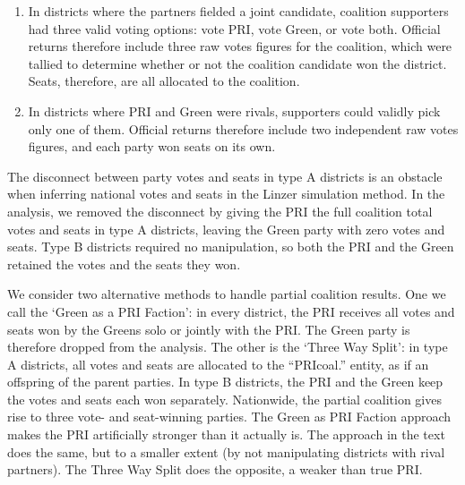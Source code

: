 \documentclass[letter,12pt]{article}
\begin{document}
\begin{enumerate}
\renewcommand{\theenumi}{\Alph{enumi}}
\item In districts where the partners fielded a joint candidate, coalition supporters had three valid voting options: vote PRI, vote Green, or vote both. Official returns therefore include three raw votes figures for the coalition, which were tallied to determine whether or not the coalition candidate won the district. Seats, therefore, are all allocated to the coalition. 
\item In districts where PRI and Green were rivals, supporters could validly pick only one of them. Official returns therefore include two independent raw votes figures, and each party won seats on its own. 
\end{enumerate}

The disconnect between party votes and seats in type A districts is an obstacle when inferring national votes and seats in the Linzer simulation method. In the analysis, we removed the disconnect by giving the PRI the full coalition total votes and seats in type A districts, leaving the Green party with zero votes and seats. Type B districts required no manipulation, so both the PRI and the Green retained the votes and the seats they won. 

We consider two alternative methods to handle partial coalition results. One we call the `Green as a PRI Faction': in every district, the PRI receives all votes and seats won by the Greens solo or jointly with the PRI. The Green party is therefore dropped from the analysis. The other is the `Three Way Split': in type A districts, all votes and seats are allocated to the ``PRIcoal.'' entity, as if an offspring of the parent parties. In type B districts, the PRI and the Green keep the votes and seats each won separately. Nationwide, the partial coalition gives rise to three vote- and seat-winning parties. The Green as PRI Faction approach makes the PRI artificially stronger than it actually is. The approach in the text does the same, but to a smaller extent (by not manipulating districts with rival partners). The Three Way Split does the opposite, a weaker than true PRI. 
\end{document}
